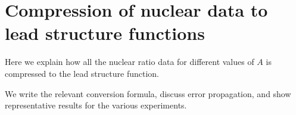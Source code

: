 
\section{Compression of nuclear data to lead structure functions}

Here we explain how all the nuclear ratio data for different
values of $A$ is compressed to the lead structure function.

We write the relevant conversion formula, discuss error propagation,
and show representative results for the various experiments.
